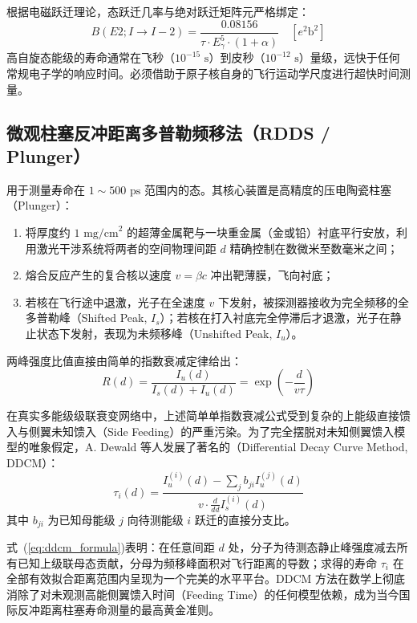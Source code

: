 根据电磁跃迁理论，态跃迁几率与绝对跃迁矩阵元严格绑定：
\begin{equation}
    B(E2; I \to I-2) = \frac{0.08156}{\tau \cdot E_\gamma^5 \cdot (1 + \alpha)} \quad [e^2\text{b}^2]
    \label{eq:be2_lifetime}
\end{equation}
高自旋态能级的寿命通常在飞秒（$10^{-15}\text{ s}$）到皮秒（$10^{-12}\text{ s}$）量级，远快于任何常规电子学的响应时间。必须借助于原子核自身的飞行运动学尺度进行超快时间测量。

\subsection{微观柱塞反冲距离多普勒频移法（RDDS / Plunger）}

用于测量寿命在 $1 \sim 500\text{ ps}$ 范围内的态。其核心装置是高精度的压电陶瓷柱塞（Plunger）：
\begin{enumerate}
    \item 将厚度约 $1\text{ mg/cm}^2$ 的超薄金属靶与一块重金属（金或铅）衬底平行安放，利用激光干涉系统将两者的空间物理间距 $d$ 精确控制在数微米至数毫米之间；
    \item 熔合反应产生的复合核以速度 $v = \beta c$ 冲出靶薄膜，飞向衬底；
    \item 若核在飞行途中退激，光子在全速度 $v$ 下发射，被探测器接收为完全频移的全多普勒峰（Shifted Peak, $I_s$）；若核在打入衬底完全停滞后才退激，光子在静止状态下发射，表现为未频移峰（Unshifted Peak, $I_u$）。
\end{enumerate}

两峰强度比值直接由简单的指数衰减定律给出：
\begin{equation}
    R(d) = \frac{I_u(d)}{I_s(d) + I_u(d)} = \exp\left( -\frac{d}{v \tau} \right)
    \label{eq:rdds_decay}
\end{equation}

在真实多能级级联衰变网络中，上述简单单指数衰减公式受到复杂的上能级直接馈入与侧翼未知馈入（Side Feeding）的严重污染。为了完全摆脱对未知侧翼馈入模型的唯象假定，A. Dewald 等人发展了著名的（Differential Decay Curve Method, DDCM）：
\begin{equation}
    \tau_i(d) = \frac{I_u^{(i)}(d) - \sum_{j} b_{ji} I_u^{(j)}(d)}{v \cdot \frac{d}{dd} I_s^{(i)}(d)}
    \label{eq:ddcm_formula}
\end{equation}
其中 $b_{ji}$ 为已知母能级 $j$ 向待测能级 $i$ 跃迁的直接分支比。

式~(\ref{eq:ddcm_formula})表明：在任意间距 $d$ 处，分子为待测态静止峰强度减去所有已知上级联母态贡献，分母为频移峰面积对飞行距离的导数；求得的寿命 $\tau_i$ 在全部有效拟合距离范围内呈现为一个完美的水平平台。DDCM 方法在数学上彻底消除了对未观测高能侧翼馈入时间（Feeding Time）的任何模型依赖，成为当今国际反冲距离柱塞寿命测量的最高黄金准则。

